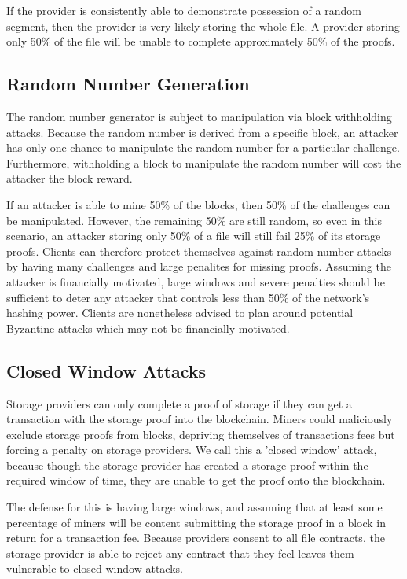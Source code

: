 \documentclass[twocolumn]{article}
\begin{document}

If the provider is consistently able to demonstrate possession of a random segment, then the provider is very likely storing the whole file.
A provider storing only 50\% of the file will be unable to complete approximately 50\% of the proofs.

\subsection{Random Number Generation}
The random number generator is subject to manipulation via block withholding attacks.
Because the random number is derived from a specific block, an attacker has only one chance to manipulate the random number for a particular challenge.
Furthermore, withholding a block to manipulate the random number will cost the attacker the block reward.

If an attacker is able to mine 50\% of the blocks, then 50\% of the challenges can be manipulated.
However, the remaining 50\% are still random, so even in this scenario, an attacker storing only 50\% of a file will still fail 25\% of its storage proofs.
Clients can therefore protect themselves against random number attacks by having many challenges and large penalites for missing proofs.
Assuming the attacker is financially motivated, large windows and severe penalties should be sufficient to deter any attacker that controls less than 50\% of the network's hashing power.
Clients are nonetheless advised to plan around potential Byzantine attacks which may not be financially motivated.

\subsection{Closed Window Attacks}
Storage providers can only complete a proof of storage if they can get a transaction with the storage proof into the blockchain.
Miners could maliciously exclude storage proofs from blocks, depriving themselves of transactions fees but forcing a penalty on storage providers.
We call this a 'closed window' attack, because though the storage provider has created a storage proof within the required window of time, they are unable to get the proof onto the blockchain.

The defense for this is having large windows, and assuming that at least some percentage of miners will be content submitting the storage proof in a block in return for a transaction fee.
Because providers consent to all file contracts, the storage provider is able to reject any contract that they feel leaves them vulnerable to closed window attacks.
\end{document}
